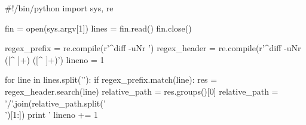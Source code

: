 \begin{pythoncode}
#!/bin/python
import sys, re

fin = open(sys.argv[1])
lines = fin.read()
fin.close()

regex_prefix = re.compile(r'^diff -uNr ')
regex_header = re.compile(r'^diff -uNr ([^ ]+) ([^ ]+)')
lineno = 1

for line in lines.split('\n'):
    if regex_prefix.match(line):
        res = regex_header.search(line)
        relative_path = res.groups()[0]
        relative_path = '/'.join(relative_path.split('\\')[1:])
        print '%
    lineno += 1
\end{pythoncode}

